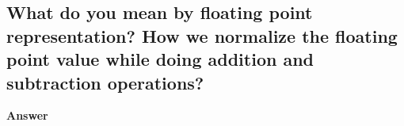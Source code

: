 \documentclass[11pt, a4paper, oneside]{book}
\begin{document}

              \subsection{What do you mean by floating point representation? How we normalize the floating point value while doing addition and subtraction operations?}
                \textbf{Answer}
\end{document}
